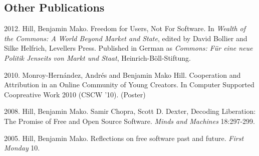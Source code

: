 \documentclass[10pt]{article}
\newenvironment{cvlist}{
\begin{list}{}{\leftmargin=3.0em \itemindent=-3.0em}
  \setlength{\itemsep}{0pt}
  \setlength{\parskip}{0em}
  \setlength{\parsep}{1em}
  \setlength{\parindent}{0em}}
{\vspace{1em}
\end{list}}
\begin{document}


\subsection{Other Publications}
\begin{cvlist}
\item 2012. Hill, Benjamin Mako. Freedom for Users, Not For Software.
  In \emph{Wealth of the Commons: A World Beyond Market and State},
  edited by David Bollier and Silke Helfrich, Levellers
  Press. Published in German as \emph{Commons: Für eine neue Politik
    Jenseits von Markt und Staat}, Heinrich-Böll-Stiftung.
\item 2010. Monroy-Hernández, Andrés and Benjamin Mako
  Hill. Cooperation and Attribution in an Online Community of
  Young Creators. In Computer Supported Coopreative Work 2010
  (CSCW '10). (Poster)
\item 2008. Hill, Benjamin Mako. Samir Chopra, Scott
  D. Dexter, Decoding Liberation: The Promise of Free and Open Source
  Software. \emph{Minds and Machines} 18:297-299.
\item 2005. Hill, Benjamin Mako. Reflections on free
  software past and future. \emph{First Monday} 10.

\end{cvlist}
\end{document}
